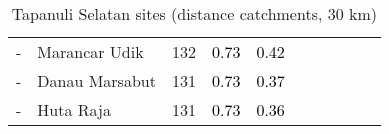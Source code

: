 \begin{table}[ht]
\begin{tabular}{C{0.03\textwidth}C{0.12\textwidth}C{0.09\textwidth}C{0.08\textwidth}C{0.08\textwidth}C{0.08\textwidth}C{0.07\textwidth}C{0.07\textwidth}C{0.07\textwidth}C{0.07\textwidth}}
  {-} & Marancar Udik & 132 & \textcolor[HTML]{000000}{0.73} & \textcolor[HTML]{000000}{0.42} & \textcolor[HTML]{FFFFFF}{4} &  &  &  &  \\ 
  {-} & Danau Marsabut & 131 & \textcolor[HTML]{000000}{0.73} & \textcolor[HTML]{000000}{0.37} & \textcolor[HTML]{FFFFFF}{4} &  &  &  &  \\ 
  {-} & Huta Raja & 131 & \textcolor[HTML]{000000}{0.73} & \textcolor[HTML]{000000}{0.36} & \textcolor[HTML]{FFFFFF}{4} &  &  &  &  \\ 
  \end{tabular}
\endgroup
\caption{Tapanuli Selatan sites (distance catchments, 30 km)} 
\label{tab:tapanuli_selatan_dist}
\end{table}
